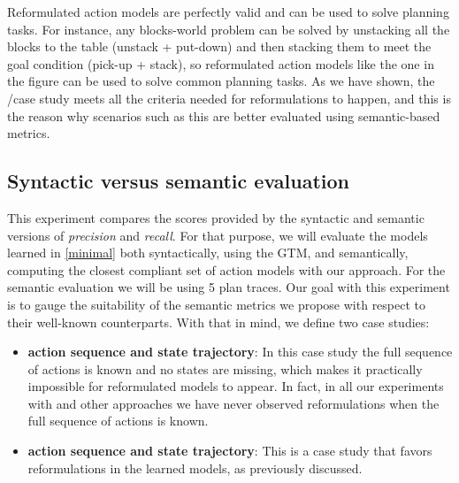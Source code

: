 Reformulated action models are perfectly valid and can be used to solve planning tasks. For instance, any blocks-world problem can be solved by unstacking all the blocks to the table (unstack + put-down) and then stacking them to meet the goal condition (pick-up + stack), so reformulated action models like the one in the figure can be used to solve common planning tasks. As we have shown, the \NO/\NO case study meets all the criteria needed for reformulations to happen, and this is the reason why scenarios such as this are better evaluated using semantic-based metrics.


\subsection{Syntactic versus semantic evaluation}

This experiment compares the scores provided by the syntactic and semantic versions of {\em precision} and {\em recall}. For that purpose, we will evaluate the models learned in \ref{minimal} both syntactically, using the GTM, and semantically, computing the closest compliant set of action models with our approach. For the semantic evaluation we will be using 5 plan traces.  Our goal with this experiment is to gauge the suitability of the semantic metrics we propose with respect to their well-known counterparts. With that in mind, we define two case studies:

\begin{itemize}
	\item \textbf{\FO action sequence and \PO state trajectory}: In this case study the full sequence of actions is known and no states are missing, which makes it practically impossible for reformulated models to appear. In fact, in all our experiments with \FAMA and other approaches we have never observed reformulations when the full sequence of actions is known.
	\item  \textbf{\NO action sequence and \NO state trajectory}: This is a case study that favors reformulations in the learned models, as previously discussed.
\end{itemize}

